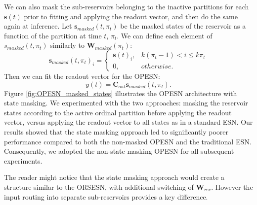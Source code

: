 We can also mask the sub-reservoirs belonging to the inactive partitions for each $\mathbf{s}(t)$ prior to fitting and applying the readout vector, and then do the same again at inference. Let $\mathbf{s}_{masked}(t,\pi_t)$ be the masked states of the reservoir as a function of the partition at time $t$, $\pi_t$. We can define each element of $s_{masked}(t,\pi_t)$ similarly to $\mathbf{W}_{masked}(\pi_t)$:
\[
    \mathbf{s}_{masked}(t,\pi_t)_i = \begin{cases}
        \mathbf{s}(t)_i, & k(\pi_t-1) < i \leq k\pi_t\\
        0,                   & otherwise.
    \end{cases}
\]
Then we can fit the readout vector for the OPESN:
\[
    y(t) = \mathbf{C}_{out}\mathbf{s}_{masked}(t, \pi_t).
\]
Figure \ref{fig:OPESN_masked_states} illustrates the OPESN architecture with state masking. We experimented with the two approaches: masking the reservoir states according to the active ordinal partition before applying the readout vector, versus applying the readout vector to all states as in a standard ESN. Our results showed that the state masking approach led to significantly poorer performance compared to both the non-masked OPESN and the traditional ESN. Consequently, we adopted the non-state masking OPESN for all subsequent experiments.

The reader might notice that the state masking approach would create a structure similar to the ORSESN, with additional switching of $\mathbf{W}_{rec}$. However the input routing into separate sub-reservoirs provides a key difference.

